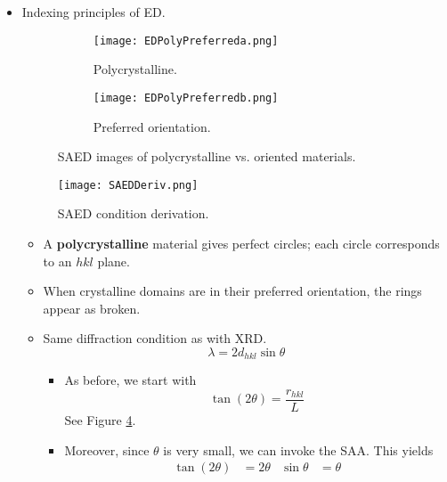 \documentclass[../notes.tex]{subfiles}
\begin{document}
\begin{itemize}
\begin{itemize}
    \end{itemize}
    \item Indexing principles of ED.
    \begin{figure}[H]
        \centering
        \begin{subfigure}[b]{0.3\linewidth}
            \centering
            \texttt{[image: EDPolyPreferreda.png]}
            \caption{Polycrystalline.}
            \label{fig:EDPolyPreferreda}
        \end{subfigure}
        \begin{subfigure}[b]{0.3\linewidth}
            \centering
            \texttt{[image: EDPolyPreferredb.png]}
            \caption{Preferred orientation.}
            \label{fig:EDPolyPreferredb}
        \end{subfigure}
        \caption{SAED images of polycrystalline vs. oriented materials.}
        \label{fig:EDPolyPreferred}
    \end{figure}
    \begin{figure}[H]
        \centering
        \texttt{[image: SAEDDeriv.png]}
        \caption{SAED condition derivation.}
        \label{fig:SAEDDeriv}
    \end{figure}
    \begin{itemize}
        \item A \textbf{polycrystalline} material gives perfect circles; each circle corresponds to an $hkl$ plane.
        \item When crystalline domains are in their preferred orientation, the rings appear as broken.
        \item Same diffraction condition as with XRD.
        \begin{equation*}
            \lambda = 2d_{hkl}\sin\theta
        \end{equation*}
        \begin{itemize}
            \item As before, we start with
            \begin{equation*}
                \tan(2\theta) = \frac{r_{hkl}}{L}
            \end{equation*}
            See Figure \ref{fig:SAEDDeriv}.
            \item Moreover, since $\theta$ is very small, we can invoke the SAA. This yields
            \begin{align*}
                \tan(2\theta) &= 2\theta&
                \sin\theta &= \theta
            \end{align*}

\end{itemize}
\end{itemize}
\end{itemize}
\end{document}
